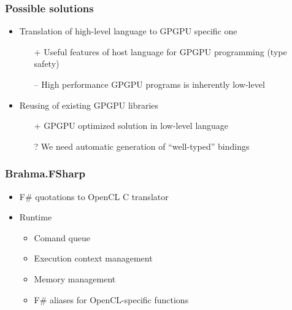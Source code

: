 \documentclass[xcolor=table]{beamer}
\begin{document}
\begin{frame}[fragile]
  \transwipe[direction=90]
  \frametitle{Possible solutions}
  \begin{itemize}
  \item Translation of high-level language to GPGPU specific one
    \begin{itemize}
  \item[+] Useful features of host language for GPGPU programming (type safety)
  \item[--] High performance GPGPU programs is inherently low-level
  \end{itemize}
  \item Reusing of existing GPGPU libraries
      \begin{itemize}
  \item[+] GPGPU optimized solution in low-level language
  \item[?] We need automatic generation of ``well-typed'' bindings
  \end{itemize}

  \end{itemize}
\end{frame}

\begin{frame}[fragile]
  \transwipe[direction=90]
  \frametitle{Brahma.FSharp}
  \begin{itemize}
  \item F\# quotations to OpenCL C translator
  \item Runtime
      \begin{itemize}
        \item Comand queue
        \item Execution context management
        \item Memory management
        \item F\# aliases for OpenCL-specific functions
      \end{itemize}

  \end{itemize}
\end{frame}
\end{document}
